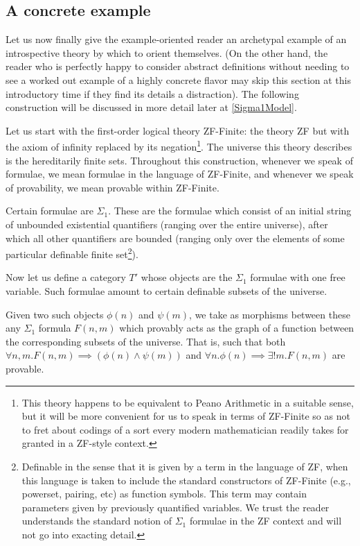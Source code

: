 \subsection{A concrete example}

\begin{construction}\label{SigmaModelSimple}
Let us now finally give the example-oriented reader an archetypal example of an introspective theory by which to orient themselves. (On the other hand, the reader who is perfectly happy to consider abstract definitions without needing to see a worked out example of a highly concrete flavor may skip this section at this introductory time if they find its details a distraction). The following construction will be discussed in more detail later at \cref{Sigma1Model}.
\end{construction}

Let us start with the first-order logical theory ZF-Finite: the theory ZF but with the axiom of infinity replaced by its negation\footnote{This theory happens to be equivalent to Peano Arithmetic in a suitable sense, but it will be more convenient for us to speak in terms of ZF-Finite so as not to fret about codings of a sort every modern mathematician readily takes for granted in a ZF-style context.}. The universe this theory describes is the hereditarily finite sets. Throughout this construction, whenever we speak of formulae, we mean formulae in the language of ZF-Finite, and whenever we speak of provability, we mean provable within ZF-Finite.

Certain formulae are $\Sigma_1$. These are the formulae which consist of an initial string of unbounded existential quantifiers (ranging over the entire universe), after which all other quantifiers are bounded (ranging only over the elements of some particular definable finite set\footnote{Definable in the sense that it is given by a term in the language of ZF, when this language is taken to include the standard constructors of ZF-Finite (e.g., powerset, pairing, etc) as function symbols. This term may contain parameters given by previously quantified variables. We trust the reader understands the standard notion of $\Sigma_1$ formulae in the ZF context and will not go into exacting detail.}).

Now let us define a category $T'$ whose objects are the $\Sigma_1$ formulae with one free variable. Such formulae amount to certain definable subsets of the universe.

Given two such objects $\phi(n)$ and $\psi(m)$, we take as morphisms between these any $\Sigma_1$ formula $F(n, m)$ which provably acts as the graph of a function between the corresponding subsets of the universe. That is, such that both $\forall n, m . F(n, m) \implies (\phi(n) \wedge \psi(m))$ and $\forall n . \phi(n) \implies \exists! m . F(n, m)$ are provable.

